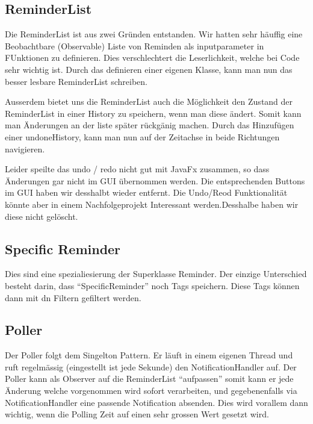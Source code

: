 \subsection{ReminderList}
Die ReminderList ist aus zwei Gründen entstanden.
Wir hatten sehr häuffig eine Beobachtbare (Observable) Liste von Reminden als inputparameter in FUnktionen zu definieren. Dies verschlechtert die Leserlichkeit, welche bei Code sehr wichtig ist.
Durch das definieren einer eigenen Klasse, kann man nun das besser lesbare ReminderList schreiben.

Ausserdem bietet uns die ReminderList auch die Möglichkeit den Zustand der ReminderList  in einer History zu speichern, wenn man diese ändert.
Somit kann man Änderungen an der liste später rückgänig machen. Durch das Hinzufügen einer undoneHistory, kann man nun auf der Zeitachse in beide Richtungen navigieren.

Leider speilte das undo / redo nicht gut mit JavaFx zusammen, so dass Änderungen gar nicht im GUI übernommen werden. Die entsprechenden Buttons im GUI haben wir desshalbt wieder entfernt. Die Undo/Reod Funktionalität könnte aber in einem Nachfolgeprojekt Interessant werden.Desshalbe haben wir diese nicht  gelöscht.
\subsection{Specific Reminder}

Dies sind eine spezialiesierung der Superklasse Reminder. Der einzige Unterschied besteht darin, dass ``SpecificReminder'' noch Tags speichern. Diese Tags können dann mit dn Filtern gefiltert werden.

\subsection{Poller}
Der Poller folgt dem Singelton Pattern. Er läuft in einem eigenen Thread und ruft regelmässig (eingestellt ist jede Sekunde) den NotificationHandler auf.
Der Poller kann als Observer auf die ReminderList ``aufpassen'' somit kann er jede Änderung welche vorgenommen wird sofort verarbeiten, und gegebenenfalls  via NotificationHandler eine passende Notification absenden. Dies wird vorallem dann wichtig, wenn die Polling Zeit auf einen sehr grossen Wert gesetzt wird.

